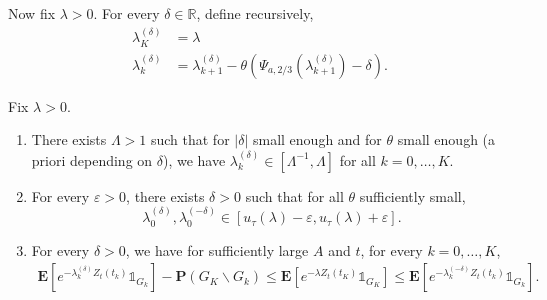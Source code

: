 \documentclass[AHL,Unicode,longabstracts,published]{cedram}
\newcommand*\eps{\varepsilon}
\newcommand*\E{\mathbf{E}}
\renewcommand*\P{\mathbf{P}}
\newcommand*\R{\mathbb{R}}
\newcommand{\1} {\mathds{1}}
\begin{document}
Now fix $\lambda > 0$. For every $\delta \in\R$, define recursively,
\begin{align*}
\lambda_K^{(\delta)} &= \lambda\\
\lambda_k^{(\delta)} &= \lambda_{k+1}^{(\delta)} - \theta\left(\Psi_{a,2/3}\left(\lambda_{k+1}^{(\delta)}\right) - \delta\right).
\end{align*}

\begin{lemm}\label{lem:csbp_lambda_delta}
Fix $\lambda > 0$.
\begin{enumerate}
\item There exists $\Lambda > 1$ such that for $|\delta|$ small enough and for $\theta$ small enough (a priori depending on $\delta$), we have $\lambda_k^{(\delta)} \in [\Lambda^{-1},\Lambda]$ for all $k=0,\ldots,K$.
\item For every $\eps>0$, there exists $\delta > 0$ such that for all $\theta$ sufficiently small,
\[
\lambda_0^{(\delta)},\lambda_0^{(-\delta)} \in \left[u_\tau(\lambda)-\eps,u_\tau(\lambda)+\eps\right].
\]
\item For every $\delta>0$, we have for sufficiently large $A$ and $t$, for every $k=0,\ldots,K$,
\begin{align}\label{eq:752}
\E\left[e^{-\lambda_k^{(\delta)}Z_t(t_k)}\1_{G_k}\right] -\P\left(G_K\backslash G_k\right) \le \E\left[e^{-\lambda Z_t(t_K)}\1_{G_K}\right] \le \E\left[e^{-\lambda_k^{(-\delta)}Z_t(t_k)}\1_{G_k}\right].
\end{align}
\end{enumerate}
\end{lemm}
\end{document}
